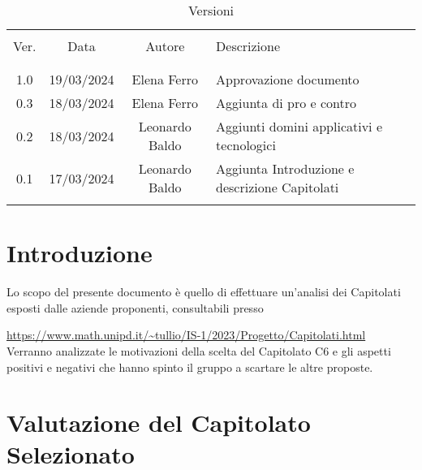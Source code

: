 \documentclass[italian,12pt]{article} %
\begin{document}


\newpage



\begin{table}[!h]
	\caption{Versioni}
	\begin{center}
		\begin{tabular}{ c c c p{9cm} }
			\hline                                                                              \\[-2ex]
			Ver. & Data       & Autore         & Descrizione                                    \\
			\\[-2ex] \hline \\[-1.5ex]
			1.0  & 19/03/2024 & Elena Ferro    & Approvazione documento                               \\
			0.3  & 18/03/2024 & Elena Ferro    & Aggiunta di pro e contro                       \\
			0.2  & 18/03/2024 & Leonardo Baldo & Aggiunti domini applicativi e tecnologici      \\
			0.1  & 17/03/2024 & Leonardo Baldo & Aggiunta Introduzione e descrizione Capitolati \\
			\\[-1.5ex] \hline
		\end{tabular}
	\end{center}
\end{table}

\newpage

\tableofcontents

\newpage

\section{Introduzione}
Lo scopo del presente documento è quello di effettuare un'analisi dei Capitolati esposti
dalle aziende proponenti, consultabili presso

\url{https://www.math.unipd.it/~tullio/IS-1/2023/Progetto/Capitolati.html}\\
Verranno analizzate le motivazioni della scelta del Capitolato C6
e gli aspetti positivi e negativi che hanno spinto il gruppo a scartare le altre proposte.

\section{Valutazione del Capitolato Selezionato}
\end{document}
